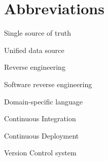 
\section*{Abbreviations}
\begin{description}[font=\rmfamily\bfseries, leftmargin=3cm, style=nextline]
	\item[SST] Single source of truth
	\item[UDS] Unified data source
	\item[RE] Reverse engineering
	\item[SRE] Software reverse engineering
	\item[DSL] Domain-specific language
	\item[CI] Continuous Integration
	\item[CD] Continuous Deployment
	\item[VCS] Version Control system
\end{description}
